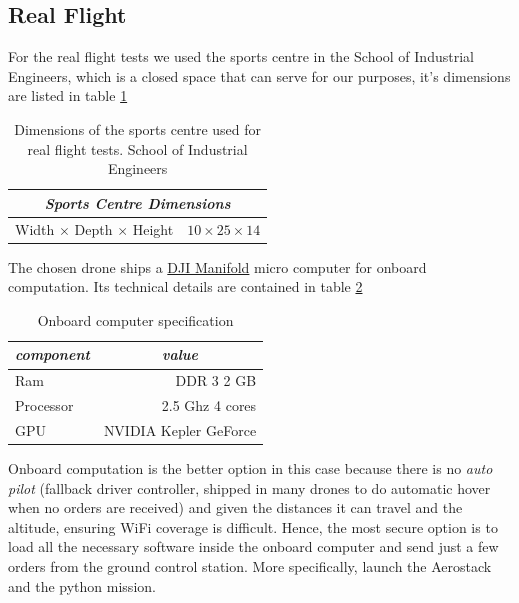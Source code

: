   \subsection{Real Flight} \label{ch_5:subsect:exp_real_flight}

    For the real flight tests we used the sports centre in the School of Industrial Engineers, which is a closed space that can serve for our purposes, it's dimensions are listed in table \ref{ch_5:table:sports_dims}

    \begin{table}[!h]
      \centering
      \begin{tabular}{lr} \toprule
        \multicolumn{2}{c}{\textit{Sports Centre Dimensions}}        \\ \midrule
        Width $\times$ Depth $\times$ Height & $10 \times 25 \times 14$ \\ \bottomrule
        \hline
      \end{tabular}
      \caption{Dimensions of the sports centre used for real flight tests. School of Industrial Engineers}
      \label{ch_5:table:sports_dims}
    \end{table}

    The chosen drone ships a \href{https://www.dji.com/es/manifold}{DJI Manifold} micro computer for onboard computation. Its technical details are contained in table \ref{ch_5:table:manifold_specs}

    \begin{table}[!h]
      \centering
      \begin{tabular}{lr} \toprule
        \multicolumn{1}{c}{\textit{component}} & \multicolumn{1}{c}{\textit{value}}   \\ \midrule
        Ram           & DDR 3 2 GB     \\
        Processor     & 2.5 Ghz 4 cores \\
        GPU           & NVIDIA Kepler GeForce \\ \bottomrule
        \hline
      \end{tabular}
      \caption{Onboard computer specification}
      \label{ch_5:table:manifold_specs}
    \end{table}

    Onboard computation is the better option in this case because there is no \textit{auto pilot} (fallback driver controller, shipped in many drones to do automatic hover when no orders are received) and given the distances it can travel and the altitude, ensuring WiFi coverage is difficult. Hence, the most secure option is to load all the necessary software inside the onboard computer and send just a few orders from the ground control station. More specifically, launch the Aerostack and the python mission.

